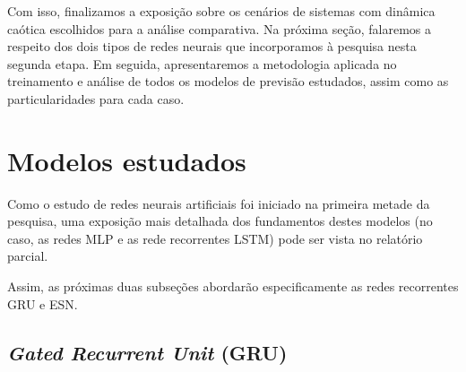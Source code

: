 \documentclass[a4paper, 12pt]{article}
\begin{document}
Com isso, finalizamos a exposição sobre os cenários de sistemas com dinâmica caótica escolhidos para a análise comparativa. Na próxima seção, falaremos a respeito dos dois tipos de redes neurais que incorporamos à pesquisa nesta segunda etapa. Em seguida, apresentaremos a metodologia aplicada no treinamento e análise de todos os modelos de previsão estudados, assim como as particularidades para cada caso.

\section{Modelos estudados}

Como o estudo de redes neurais artificiais foi iniciado na primeira metade da pesquisa, uma exposição mais detalhada dos fundamentos destes modelos (no caso, as redes MLP e as rede recorrentes LSTM) pode ser vista no relatório parcial.

Assim, as próximas duas subseções abordarão especificamente as redes recorrentes GRU e ESN.

\subsection{\textit{Gated Recurrent Unit} (GRU)}
\end{document}
